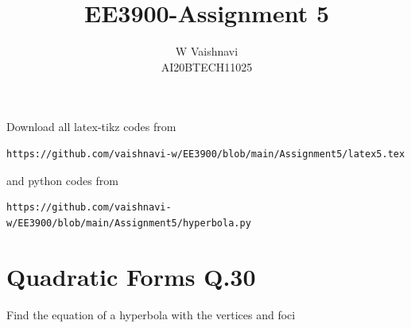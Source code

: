 \documentclass[journal,12pt,twocolumn]{IEEEtran}
\begin{document}
     \def\centbox#1{\makebox[0in]{#1}}
     \def\topbox#1{\raisebox{-\baselineskip}[0in][0in]{#1}}
     \def\midbox#1{\raisebox{-0.5\baselineskip}[0in][0in]{#1}}
\vspace{3cm}
\title{EE3900-Assignment 5}
\author{W Vaishnavi\\AI20BTECH11025}
\maketitle
\newpage
\bigskip
\renewcommand{\thefigure}{\theenumi}
\renewcommand{\thetable}{\theenumi}
Download all latex-tikz codes from 
%
\begin{lstlisting}
https://github.com/vaishnavi-w/EE3900/blob/main/Assignment5/latex5.tex
\end{lstlisting}
and python codes from 
%
\begin{lstlisting}
https://github.com/vaishnavi-w/EE3900/blob/main/Assignment5/hyperbola.py
\end{lstlisting}
\section{Quadratic Forms Q.30}
Find the equation of a hyperbola with the vertices  and foci 
\end{document}
